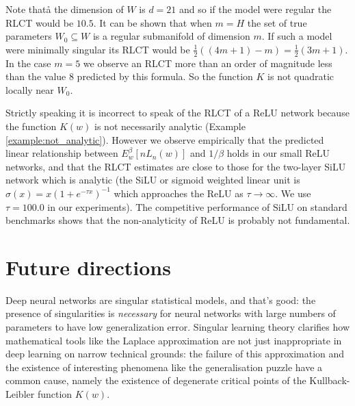 \documentclass{article} %
\begin{document}
Note thatå the dimension of $W$ is $d = 21$ and so if the model were regular the RLCT would be $10.5$. It can be shown that when $m = H$ the set of true parameters $W_0 \subseteq W$ is a regular submanifold of dimension $m$. If such a model were minimally singular its RLCT would be $\tfrac{1}{2}( (4m + 1) - m ) = \tfrac{1}{2}( 3m + 1 )$. In the case $m = 5$ we observe an RLCT more than an order of magnitude less than the value $8$ predicted by this formula. So the function $K$ is not quadratic locally near $W_0$.

Strictly speaking it is incorrect to speak of the RLCT of a ReLU network because the function $K(w)$ is not necessarily analytic (Example \ref{example:not_analytic}). However we observe empirically that the predicted linear relationship between $E^\beta_w[nL_n(w)]$ and $1/\beta$ holds in our small ReLU networks, and that the RLCT estimates are close to those for the two-layer SiLU network \citep{hendrycks2016gaussian} which is analytic (the SiLU or sigmoid weighted linear unit is $\sigma(x) = x (1 + e^{-\tau x})^{-1}$ which approaches the ReLU as $\tau \to \infty$. We use $\tau = 100.0$ in our experiments). The competitive performance of SiLU on standard benchmarks \cite{ramachandran2017swish} shows that the non-analyticity of ReLU is probably not fundamental.


\section{Future directions}

Deep neural networks are singular statistical models, and that's good: the presence of singularities is \emph{necessary} for neural networks with large numbers of parameters to have low generalization error. Singular learning theory clarifies how mathematical tools like the Laplace approximation are not just inappropriate in deep learning on narrow technical grounds: the failure of this approximation and the existence of interesting phenomena like the generalisation puzzle have a common cause, namely the existence of degenerate critical points of the Kullback-Leibler function $K(w)$. 
\end{document}
